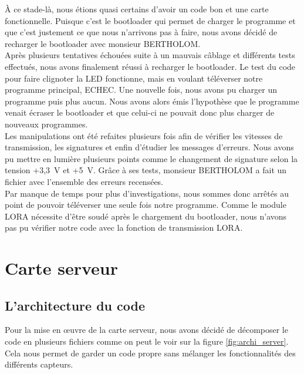                 À ce stade-là, nous étions quasi certains d’avoir un code bon et une carte fonctionnelle. Puisque c’est le bootloader qui permet de charger le programme et que c’est justement ce que nous n’arrivons pas à faire, nous avons décidé de recharger le bootloader avec monsieur BERTHOLOM. \\
                Après plusieurs tentatives échouées suite à un mauvais câblage et différents tests effectués, nous avons finalement réussi à recharger le bootloader. Le test du code pour faire clignoter la LED fonctionne, mais en voulant téléverser notre programme principal, ECHEC. 
                Une nouvelle fois, nous avons pu charger un programme puis plus aucun. Nous avons alors émis l’hypothèse que le programme venait écraser le bootloader et que celui-ci ne pouvait donc plus charger de nouveaux programmes. \\
                Les manipulations ont été refaites plusieurs fois afin de vérifier les vitesses de transmission, les signatures et enfin d’étudier les messages d’erreurs. Nous avons pu mettre en lumière plusieurs points comme le changement de signature selon la tension +3,3~V et +5~V.
                Grâce à ses tests, monsieur BERTHOLOM a fait un fichier avec l’ensemble des erreurs recensées. \\

                Par manque de temps pour plus d’investigations, nous sommes donc arrêtés au point de pouvoir téléverser une seule fois notre programme. Comme le module LORA nécessite d’être soudé après le chargement du bootloader, nous n’avons pas pu vérifier notre code avec la fonction de transmission LORA.  





    \section{Carte serveur}
        \subsection{L'architecture du code}
            Pour la mise en œuvre de la carte serveur, nous avons décidé de décomposer le code en plusieurs fichiers comme on peut le voir sur la figure \ref{fig:archi_server}. Cela nous permet de garder un code propre sans mélanger les fonctionnalités
            des différents capteurs.



